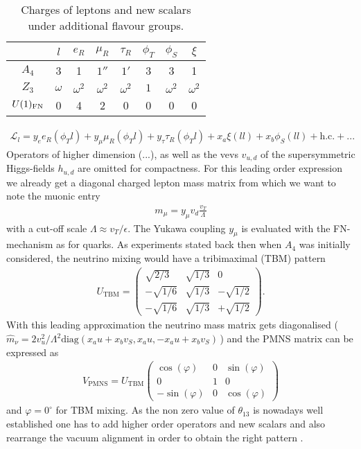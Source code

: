\begin{table}
 \begin{tabular}{c|cccc|ccc}
  &$l$&$e_R$&$\mu_R$&$\tau_R$&$\phi_T$&$\phi_S$&$\xi$\\
  \hline
  $A_4$ & 3&1&$1''$&$1'$&3&3&1\\
  $Z_3$ & $\omega$&$\omega^2$&$\omega^2$&$\omega^2$&$1$&$\omega^2$&$\omega^2$\\
  $U(1)_\text{FN}$ & 0&4&2&0&0&0&0
 \end{tabular}
\caption{Charges of leptons and new scalars under additional flavour groups.}
\label{tab_a4charges}
\end{table}
\begin{align}
 \mathcal{L}_l = y_e e_R(\phi_T l) + y_\mu \mu_R (\phi_T l) + y_\tau \tau_R(\phi_Tl) + x_a\xi(ll) + x_b \phi_S (ll) + \text{h.c.}+...
\end{align}
Operators of higher dimension (...), as well as the vevs $v_{u,d}$ of the supersymmetric Higgs-fields $h_{u,d}$ are omitted for compactness. 
For this leading order expression we already get a diagonal charged lepton mass matrix from which we want to note the muonic entry
\begin{align}
 m_\mu = y_\mu v_d \frac{v_T}{\Lambda}
 \label{eq_muonmass}
\end{align}
with a cut-off scale $\Lambda\approx v_T/\epsilon$. The Yukawa coupling $y_\mu$ is evaluated with the FN-mechanism as for quarks. As experiments
stated back then when $A_4$ was initially considered, the neutrino mixing would have a tribimaximal (TBM) pattern 
\begin{align}
 U_\text{TBM} = \begin{pmatrix}
                 \sqrt{2/3}&\sqrt{1/3}&0\\
                 -\sqrt{1/6}&\sqrt{1/3}&-\sqrt{1/2}\\
                 -\sqrt{1/6}&\sqrt{1/3}&+\sqrt{1/2}
                \end{pmatrix}.
\end{align}
With this leading approximation the neutrino mass matrix gets diagonalised (\,$\hat{m}_\nu=2v_u^2/\Lambda^2 \text{diag}(x_au+x_bv_S,x_au,-x_au+x_bv_S)$\,)
and the PMNS matrix can be expressed as \cite{1211.5370}
\begin{align}
 V_\text{PMNS} = U_\text{TBM}\begin{pmatrix}
                              \cos(\varphi) & 0 &\sin(\varphi)\\
                              0&1&0\\
                              -\sin(\varphi) & 0 & \cos(\varphi)
                             \end{pmatrix}
\end{align}
and $\varphi = 0^\circ$ for TBM mixing.
As the non zero value of $\theta_{13}$ is nowadays well established \cite{1303.1289} one has to add higher order operators and new scalars and
also rearrange the vacuum alignment in order to obtain the right pattern \cite{1211.5370}\cite{Tprime}. 


